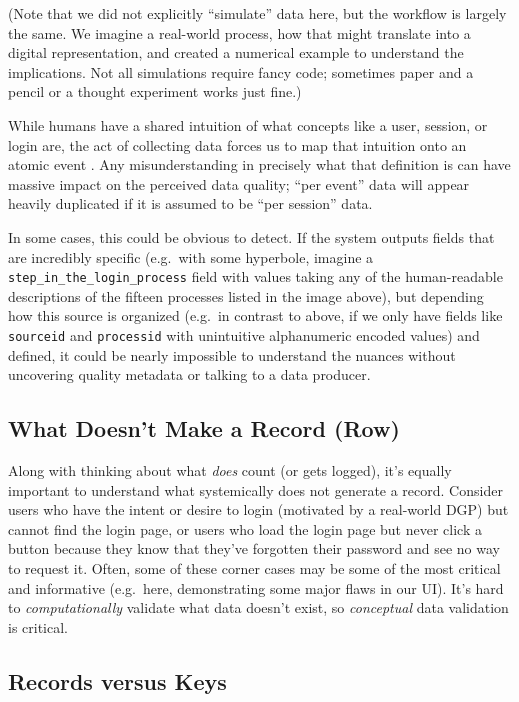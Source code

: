 \documentclass[
]{krantz}
\begin{document}
(Note that we did not explicitly ``simulate'' data here, but the workflow is largely the same. We imagine a real-world process, how that might translate into a digital representation, and created a numerical example to understand the implications. Not all simulations require fancy code; sometimes paper and a pencil or a thought experiment works just fine.)

While humans have a shared intuition of what concepts like a user, session, or login are, the act of collecting data forces us to map that intuition onto an atomic event .
Any misunderstanding in precisely what that definition is can have massive impact on the perceived data quality; ``per event'' data will appear heavily duplicated if it is assumed to be ``per session'' data.

In some cases, this could be obvious to detect.
If the system outputs fields that are incredibly specific (e.g.~with some hyperbole, imagine a \texttt{step\_in\_the\_login\_process} field with values taking any of the human-readable descriptions of the fifteen processes listed in the image above), but depending how this source is organized (e.g.~in contrast to above, if we only have fields like \texttt{sourceid} and \texttt{processid} with unintuitive alphanumeric encoded values) and defined, it could be nearly impossible to understand the nuances without uncovering quality metadata or talking to a data producer.

\hypertarget{what-doesnt-make-a-record-row}{%
\subsection{What Doesn't Make a Record (Row)}\label{what-doesnt-make-a-record-row}}

Along with thinking about what \emph{does} count (or gets logged), it's equally important to understand what systemically does not generate a record. Consider users who have the intent or desire to login (motivated by a real-world DGP) but cannot find the login page, or users who load the login page but never click a button because they know that they've forgotten their password and see no way to request it.
Often, some of these corner cases may be some of the most critical and informative (e.g.~here, demonstrating some major flaws in our UI).
It's hard to \emph{computationally} validate what data doesn't exist, so \emph{conceptual} data validation is critical.

\hypertarget{records-versus-keys}{%
\subsection{Records versus Keys}\label{records-versus-keys}}
\end{document}
